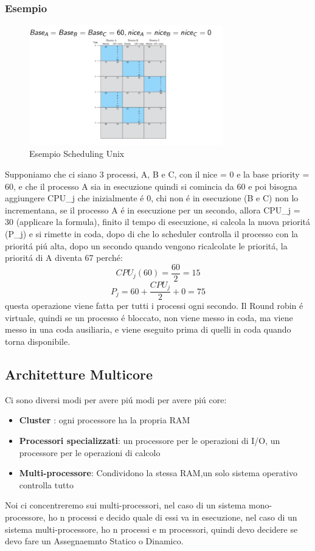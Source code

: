     \subsubsection*{Esempio}
    \begin{figure}
        \centering
        \includegraphics[width=0.75\textwidth]{immagini/EsempioSchedulingUnix}
        \caption{Esempio Scheduling Unix}
    \end{figure}
    Supponiamo che ci siano 3 processi, A, B e C, con il nice = 0 e la base priority = 60, e che il processo A sia in esecuzione
    quindi si comincia da 60 e poi bisogna aggiungere CPU_j che inizialmente é 0, chi non é in esecuzione (B e C) non lo incrementana,
    se il processo A é in esecuzione per un secondo, allora CPU_j = 30 (applicare la formula), finito il tempo di esecuzione,
    si calcola la nuova prioritá (P_j) e si rimette in coda, dopo di che lo scheduler controlla il processo con la prioritá piú alta,
    dopo un secondo quando vengono ricalcolate le prioritá, la prioritá di A diventa 67 perché:
    \begin{equation}
        CPU_j(60) = \frac{60}{2} = 15
    \end{equation}
    \begin{equation}
        P_j = 60 + \frac{CPU_j}{2} + 0 = 75
    \end{equation}
    questa operazione viene fatta per tutti i processi ogni secondo.
    Il Round robin é virtuale, quindi se un processo é bloccato, non viene messo in coda, ma viene messo in una coda ausiliaria,
    e viene eseguito prima di quelli in coda quando torna disponibile.
    \subsection{Architetture Multicore}
    Ci sono diversi modi per avere piú modi per avere piú core:
    \begin{itemize}
        \item \textbf{Cluster} : ogni processore ha la propria RAM
        \item \textbf{Processori specializzati}: un processore per le operazioni di I/O, un processore per le operazioni di calcolo
        \item \textbf{Multi-processore}: Condividono la stessa RAM,un solo sistema operativo controlla tutto
    \end{itemize}
    Noi ci concentreremo sui multi-processori, nel caso di un sistema mono-processore, ho n processi e decido quale di
    essi va in esecuzione, nel caso di un sistema multi-processore, ho n processi e m processori, quindi devo decidere
    se devo fare un Assegnaemnto Statico o Dinamico.
